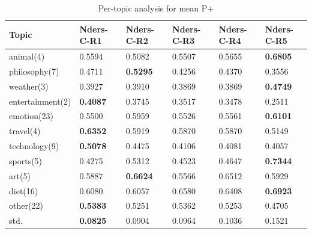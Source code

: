 \documentclass{sig-alternate}
\begin{document}
\begin{table}[]
\centering
\caption{Per-topic analysis for mean P+}
\label{my-label}
\begin{tabular}{llllll}
\hline
Topic & Nders-C-R1 & Nders-C-R2 & Nders-C-R3 & Nders-C-R4 & Nders-C-R5  \\
\hline
animal(4) & 0.5594 & 0.5082 & 0.5507 & 0.5655 & \textbf{0.6805} \\
philosophy(7) & 0.4711 & \textbf{0.5295} & 0.4256 & 0.4370 & 0.3556 \\
weather(3) & 0.3927 & 0.3910 & 0.3869 & 0.3869 & \textbf{0.4749} \\
entertainment(2) & \textbf{0.4087} & 0.3745 & 0.3517 & 0.3478 & 0.2511 \\
emotion(23) & 0.5500 & 0.5959 & 0.5526 & 0.5561 & \textbf{0.6101} \\
travel(4) & \textbf{0.6352} & 0.5919 & 0.5870 & 0.5870 & 0.5149 \\
technology(9) & \textbf{0.5078} & 0.4475 & 0.4106 & 0.4081 & 0.4057 \\
sports(5) & 0.4275 & 0.5312 & 0.4523 & 0.4647 & \textbf{0.7344} \\
art(5) & 0.5887 & \textbf{0.6624} & 0.5566 & 0.6512 & 0.5929 \\
diet(16) & 0.6080 & 0.6057 & 0.6580 & 0.6408 & \textbf{0.6923} \\
other(22) & \textbf{0.5383} & 0.5251 & 0.5362 & 0.5253 & 0.4705 \\
\hline
std.  &  \textbf{0.0825}  &  0.0904  &   0.0964 &    0.1036 &    0.1521 \\
\hline
\end{tabular}
\end{table}
\end{document}

